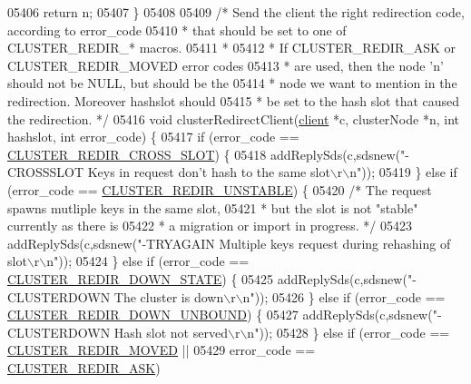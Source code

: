 \begin{DoxyCode}
{{{{{{{{{{{{{{{{{{{{{{{{{{{{{{{{{{{{{{{{{{{{{{{{{{{{{{{{{{{{{{{{{{{{{{{{{{{{{{{{{{{{{{{{{{{{{{{{{{{{{{{{{{{{{05406     \textcolor{keywordflow}{return} n;
05407 \}
05408 
05409 \textcolor{comment}{/* Send the client the right redirection code, according to error\_code}
05410 \textcolor{comment}{ * that should be set to one of CLUSTER\_REDIR\_* macros.}
05411 \textcolor{comment}{ *}
05412 \textcolor{comment}{ * If CLUSTER\_REDIR\_ASK or CLUSTER\_REDIR\_MOVED error codes}
05413 \textcolor{comment}{ * are used, then the node 'n' should not be NULL, but should be the}
05414 \textcolor{comment}{ * node we want to mention in the redirection. Moreover hashslot should}
05415 \textcolor{comment}{ * be set to the hash slot that caused the redirection. */}
05416 \textcolor{keywordtype}{void} clusterRedirectClient(\hyperlink{structclient}{client} *c, clusterNode *n, \textcolor{keywordtype}{int} hashslot, \textcolor{keywordtype}{int} error\_code) \{
05417     \textcolor{keywordflow}{if} (error\_code == \hyperlink{cluster_8h_afbca3b8aad0bd8d1f013d81af78672af}{CLUSTER\_REDIR\_CROSS\_SLOT}) \{
05418         addReplySds(c,sdsnew(\textcolor{stringliteral}{"-CROSSSLOT Keys in request don't hash to the same slot\(\backslash\)r\(\backslash\)n"}));
05419     \} \textcolor{keywordflow}{else} \textcolor{keywordflow}{if} (error\_code == \hyperlink{cluster_8h_a55ae67727361b72bce02b01dd58511f2}{CLUSTER\_REDIR\_UNSTABLE}) \{
05420         \textcolor{comment}{/* The request spawns mutliple keys in the same slot,}
05421 \textcolor{comment}{         * but the slot is not "stable" currently as there is}
05422 \textcolor{comment}{         * a migration or import in progress. */}
05423         addReplySds(c,sdsnew(\textcolor{stringliteral}{"-TRYAGAIN Multiple keys request during rehashing of slot\(\backslash\)r\(\backslash\)n"}));
05424     \} \textcolor{keywordflow}{else} \textcolor{keywordflow}{if} (error\_code == \hyperlink{cluster_8h_a62aea13c6a6bad14d00664033b3cae1a}{CLUSTER\_REDIR\_DOWN\_STATE}) \{
05425         addReplySds(c,sdsnew(\textcolor{stringliteral}{"-CLUSTERDOWN The cluster is down\(\backslash\)r\(\backslash\)n"}));
05426     \} \textcolor{keywordflow}{else} \textcolor{keywordflow}{if} (error\_code == \hyperlink{cluster_8h_ac77f67383a97866c21a56f66bada419b}{CLUSTER\_REDIR\_DOWN\_UNBOUND}) \{
05427         addReplySds(c,sdsnew(\textcolor{stringliteral}{"-CLUSTERDOWN Hash slot not served\(\backslash\)r\(\backslash\)n"}));
05428     \} \textcolor{keywordflow}{else} \textcolor{keywordflow}{if} (error\_code == \hyperlink{cluster_8h_a26a42bb5d79b437e3a8329d66d7fce81}{CLUSTER\_REDIR\_MOVED} ||
05429                error\_code == \hyperlink{cluster_8h_ae93f7d31db8c46cdf4c6a7e2f15fd00b}{CLUSTER\_REDIR\_ASK})
}}}}}}}}}}}}}}}}}}}}}}}}}}}}}}}}}}}}}}}}}}}}}}}}}}}}}}}}}}}}}}}}}}}}}}}}}}}}}}}}}}}}}}}}}}}}}}}}}}}}}}}}}}}}}
\end{DoxyCode}
